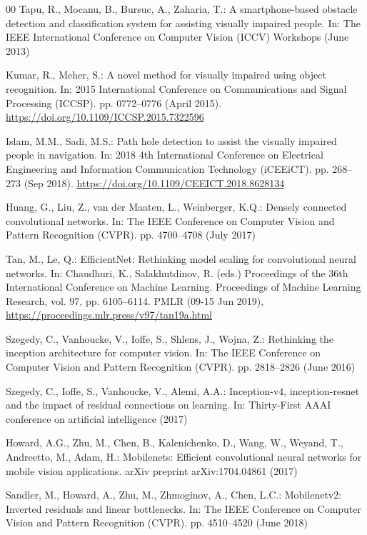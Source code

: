 \documentclass[final,5p,times,twocolumn]{elsarticle}
\begin{document}
\begin{thebibliography}{00}
Tapu, R., Mocanu, B., Bursuc, A., Zaharia, T.: A smartphone-based obstacle detection and classification system for assisting visually impaired people. In: The IEEE International Conference on Computer Vision (ICCV) Workshops (June 2013)

Kumar, R., Meher, S.: A novel method for visually impaired using object recognition. In: 2015 International Conference on Communications and Signal Processing (ICCSP). pp. 0772--0776 (April 2015). \url{https://doi.org/10.1109/ICCSP.2015.7322596}

Islam, M.M., Sadi, M.S.: Path hole detection to assist the visually impaired people in navigation. In: 2018 4th International Conference on Electrical Engineering and Information Communication Technology (iCEEiCT). pp. 268--273 (Sep 2018). \url{https://doi.org/10.1109/CEEICT.2018.8628134}

Huang, G., Liu, Z., van der Maaten, L., Weinberger, K.Q.: Densely connected convolutional networks. In: The IEEE Conference on Computer Vision and Pattern Recognition (CVPR). pp. 4700--4708 (July 2017)

Tan, M., Le, Q.: EfficientNet: Rethinking model scaling for convolutional neural networks. In: Chaudhuri, K., Salakhutdinov, R. (eds.) Proceedings of the 36th International Conference on Machine Learning. Proceedings of Machine Learning Research, vol. 97, pp. 6105--6114. PMLR (09-15 Jun 2019), \url{https://proceedings.mlr.press/v97/tan19a.html}

Szegedy, C., Vanhoucke, V., Ioffe, S., Shlens, J., Wojna, Z.: Rethinking the inception architecture for computer vision. In: The IEEE Conference on Computer Vision and Pattern Recognition (CVPR). pp. 2818--2826 (June 2016) 

Szegedy, C., Ioffe, S., Vanhoucke, V., Alemi, A.A.: Inception-v4, inception-resnet and the impact of residual connections on learning. In: Thirty-First AAAI conference on artificial intelligence (2017)

Howard, A.G., Zhu, M., Chen, B., Kalenichenko, D., Wang, W., Weyand, T., Andreetto, M., Adam, H.: Mobilenets: Efficient convolutional neural networks for mobile vision applications. arXiv preprint arXiv:1704.04861 (2017)

Sandler, M., Howard, A., Zhu, M., Zhmoginov, A., Chen, L.C.: Mobilenetv2: Inverted residuals and linear bottlenecks. In: The IEEE Conference on Computer Vision and Pattern Recognition (CVPR). pp. 4510--4520 (June 2018)


\end{thebibliography}
\end{document}
